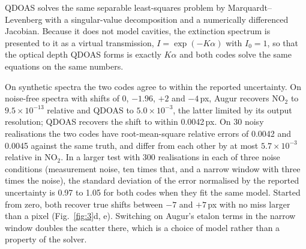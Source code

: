 QDOAS \citep{Danckaert_2017} solves the same separable least-squares problem by Marquardt--Levenberg with a
singular-value decomposition and a numerically differenced Jacobian. Because it does not model cavities, the
extinction spectrum is presented to it as a virtual transmission, $I = \exp(-K\alpha)$ with $I_0 = 1$, so that the
optical depth QDOAS forms is exactly $K\alpha$ and both codes solve the same equations on the same numbers.

On synthetic spectra the two codes agree to within the reported uncertainty. On noise-free spectra with shifts of
0, $-1.96$, $+2$ and $-4$\,px, Augur recovers NO$_2$ to $9.5\times10^{-13}$ relative and QDOAS to $5.0\times10^{-3}$,
the latter limited by its output resolution; QDOAS recovers the shift to within 0.0042\,px. On 30 noisy realisations
the two codes have root-mean-square relative errors of 0.0042 and 0.0045 against the same truth, and differ from
each other by at most $5.7\times10^{-3}$ relative in NO$_2$. In a larger test with 300 realisations in each of three
noise conditions (measurement noise, ten times that, and a narrow window with three times the noise), the standard deviation of the error normalised by the reported uncertainty is 0.97 to 1.05 for
both codes when they fit the same model. Started from zero, both recover true shifts between $-7$ and $+7$\,px with no
miss larger than a pixel (Fig.~\ref{fig:3}d, e). Switching on Augur's etalon terms in the narrow window
doubles the scatter there, which is a choice of model rather than a property of the solver.

